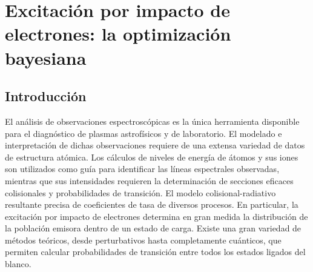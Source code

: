 \chapter{Excitación por impacto de electrones: la optimización bayesiana}
\label{chap:bayeopt}

\begin{comment}


Hay un tema que habria que trabajar si queres hacer el
paper del Be, y tiene que ver con "term dependence". Resulta que
las funciones de onda 2p son muy distintas para el singlete y para
el triplete. Eso lo explica Fischer en su libro.
Una forma de mejorar los calculos es usar las funciones de onda
que optimizan el triplete, pero ajustando la energia del gs
para que no quede todo corrido. No recuerdo bien los detalles,
nosotros publicamos un paper sobre esto (primer autor Griffin).
Es verdad que poniendo muchos pseudos deberia corregir este
efecto, pero nosotros nunca le dimos bola a este asunto.
Si te dan tanto el 2s2p 1P como el 3P bien, puede ser que
los pseudos se encargan del tema...



\end{comment}

\section{Introducción}
\label{sec:intro}

El análisis de observaciones espectroscópicas es la única herramienta 
disponible para el diagnóstico de plasmas astrofísicos y de laboratorio. 
El modelado e interpretación de dichas observaciones requiere de una 
extensa variedad de datos de estructura atómica. Los cálculos de niveles 
de energía de átomos y sus iones son utilizados como guía para 
identificar las líneas espectrales observadas, mientras que sus 
intensidades requieren la determinación de secciones eficaces 
colisionales y probabilidades de transición. El modelo 
colisional-radiativo resultante precisa de coeficientes de tasa de 
diversos procesos. En particular, la excitación por impacto de 
electrones determina en gran medida la distribución de la población 
emisora dentro de un estado de carga. Existe una gran variedad de 
métodos teóricos, desde perturbativos hasta completamente cuánticos, que 
permiten calcular probabilidades de transición entre todos los estados 
ligados del blanco.

